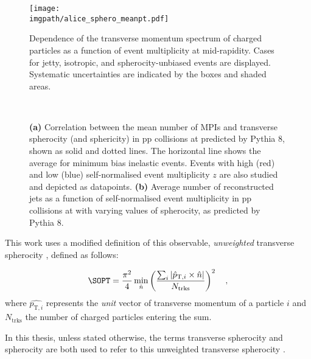 \begin{figure}%
\texttt{[image: \\imgpath/alice\_sphero\_meanpt.pdf]}
\caption{Dependence of the transverse momentum spectrum of charged particles as a function of event multiplicity at mid-rapidity. Cases for jetty, isotropic, and spherocity-unbiased events are displayed. Systematic uncertainties are indicated by the boxes and shaded areas. \cite{alicecollaborationChargedparticleProductionFunction2019}}
\label{fig:sphero:nchpt}
\end{figure}

\begin{figure}%
\\
\caption{\textbf{(a)} Correlation between the mean number of MPIs and transverse spherocity (and sphericity) in pp collisions at  predicted by Pythia 8, shown as solid and dotted lines. The horizontal line shows the average for minimum bias inelastic events. Events with high (red) and low (blue) self-normalised event multiplicity $z$ are also studied and depicted as datapoints. \cite{cuautleDisentanglingSoftHard2014} \textbf{(b)} Average number of reconstructed jets as a function of self-normalised event multiplicity in pp collisions at  with varying values of spherocity, as predicted by Pythia 8. \cite{cuautleMidrapidityChargedHadron2015}}
\label{fig:sphero:nmpinjets}
\end{figure}

This work uses a modified definition of this observable, \textit{unweighted} transverse spherocity \SOPT, defined as follows:

\begin{align}
\SOPT = \frac{\pi^2}{4} \min_{\hat{n}} \left(\frac{\sum_i
      |\hat{p}_{\textrm{T},i} \times \hat{n}|}{N_{\textrm{trks}}}  \right)^2 \quad ,
\label{eq:sOpt}      
\end{align}
where $\hat{p_{\textrm{T},i}}$ represents the \textit{unit} vector of transverse momentum of a particle $i$ and $N_{\textrm{trks}}$ the number of charged particles entering the sum. 

In this thesis, unless stated otherwise, the terms transverse spherocity and spherocity are both used to refer to this unweighted transverse spherocity \SOPT.

